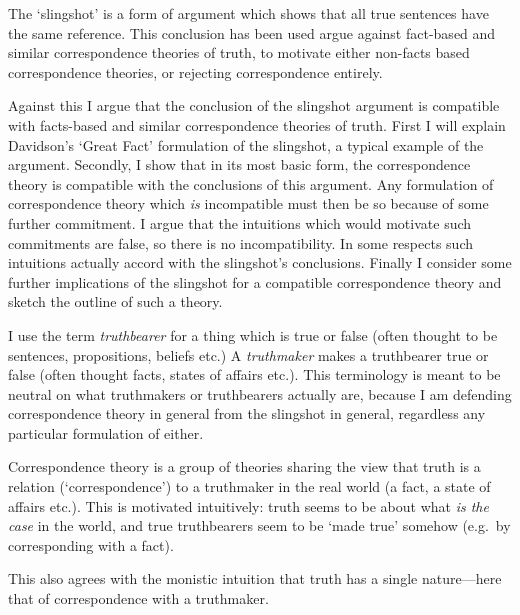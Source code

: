 The `slingshot' is a form of argument which shows that all true sentences have the same reference.
This conclusion has been used argue against fact-based and similar correspondence theories of truth, to motivate either non-facts based correspondence theories, or rejecting correspondence entirely.

Against this I argue that the conclusion of the slingshot argument is compatible with facts-based and similar correspondence theories of truth.
First I will explain Davidson's `Great Fact' formulation of the slingshot, a typical example of the argument.
Secondly, I show that in its most basic form, the correspondence theory is compatible with the conclusions of this argument.
Any formulation of correspondence theory which \emph{is} incompatible must then be so because of some further commitment.
I argue that the intuitions which would motivate such commitments are false, so there is no incompatibility.
In some respects such intuitions actually accord with the slingshot's conclusions.
Finally I consider some further implications of the slingshot for a compatible correspondence theory and sketch the outline of such a theory.

I use the term \textit{truthbearer} for a thing which is true or false (often thought to be sentences, propositions, beliefs etc.)
A \textit{truthmaker} makes a truthbearer true or false (often thought facts, states of affairs etc.).
This terminology is meant to be neutral on what truthmakers or truthbearers actually are, because I am defending correspondence theory in general from the slingshot in general, regardless any particular formulation of either.

Correspondence theory is a group of theories sharing the view that truth is a relation (`correspondence') to a truthmaker in the real world (a fact, a state of affairs etc.).
This is motivated intuitively: truth seems to be about what \emph{is the case} in the world, and true truthbearers seem to be `made true' somehow (e.g.\ by corresponding with a fact).

This also agrees with the monistic intuition that truth has a single nature---here that of correspondence with a truthmaker.

